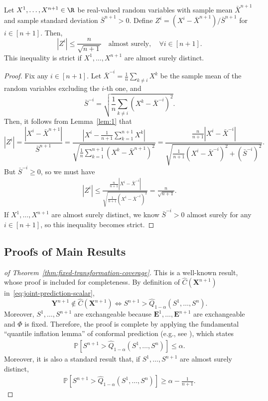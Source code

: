 \begin{lemma}\label{lem:3}
    Let $X^1,\ldots, X^{n+1} \in \R$ be real-valued random variables with sample mean $\bar{X}^{n+1}$ and sample standard deviation $\bar{S}^{n+1} > 0$. Define $Z^i = (X^i-\bar{X}^{n+1}) / \bar{S}^{n+1}$ for $i \in [n+1]$. Then,
    \[
    |Z^i| \leq \frac{n}{\sqrt{n+1}} \quad\text{almost surely}, \quad \forall i \in [n+1].
    \]
    This inequality is strict if $X^1,\ldots,X^{n+1}$ are almost surely distinct.
\end{lemma}
\begin{proof}
Fix any $i\in [n+1]$.
Let $\bar{X}^{-i} = \frac{1}{n}\sum_{k\neq i}X^k$ be the sample mean of the random variables excluding the $i$-th one, and
\[
\bar{S}^{-i} = \sqrt{\frac{1}{n}\sum_{k\neq i}(X^k - \bar{X}^{-i})^2}.
\]
Then, it follows from Lemma~\ref{lem:1} that
\[
|Z^i| = \frac{|X^i-\bar{X}^{n+1}|}{\bar{S}^{n+1}}
    = \frac{\left|X^i - \frac{1}{n+1}\sum^{n+1}_{k=1}X^k\right|}{\sqrt{\frac{1}{n}\sum^{n+1}_{k=1}(X^k - \bar{X}^{n+1})^2}}=\frac{\frac{n}{n+1}|X^i - \bar{X}^{-i}|}{\sqrt{\frac{1}{n+1}(X^i-\bar{X}^{-i})^2+(\bar{S}^{-i})^2}}.
\]
But $\bar{S}^{-i} \geq 0$, so we must have
\begin{align*}
    |Z^i|\leq \frac{\frac{n}{n+1}|X^i - \bar{X}^{-i}|}{\sqrt{\frac{1}{n+1}(X^i-\bar{X}^{-i})^2}}= \frac{n}{\sqrt{n+1}}.
\end{align*}
If $X^1,\ldots,X^{n+1}$ are almost surely distinct, we know $\bar{S}^{-i} >0$ almost surely for any $i \in [n+1]$, so this inequality becomes strict.
\end{proof}


\subsection{Proofs of Main Results}
\label{app:proofs-thms}

\begin{proof}[of Theorem~\ref{thm:fixed-transformation-coverage}]
This is a well-known result, whose proof is included for completeness. 
By definition of $\hat{C}(\mathbf{X}^{n+1})$ in~\eqref{eq:joint-prediction-scalar},
\[
 \mathbf{Y}^{n+1} \notin \hat{C}(\mathbf{X}^{n+1}) \Longleftrightarrow S^{n+1} > \hat{Q}_{1-\alpha}(S^1,\ldots,S^n).
\]
Moreover, $S^1,\ldots,S^{n+1}$ are exchangeable because $\mathbf{E}^1,\ldots,\mathbf{E}^{n+1}$ are exchangeable and $\Phi$ is fixed.
Therefore, the proof is complete by applying the fundamental ``quantile inflation lemma'' of conformal prediction (e.g., see \citet{angelopoulos2025theoreticalfoundationsconformalprediction}), which states 
\begin{align*}
  \mathbb{P}\left[ S^{n+1} > \hat{Q}_{1-\alpha}(S^1,\ldots,S^n) \right] \leq \alpha.
\end{align*}
Moreover, it is also a standard result that, if $S^1,\ldots,S^{n+1}$ are almost surely distinct,
\begin{align*}
  \mathbb{P}\left[ S^{n+1} > \hat{Q}_{1-\alpha}(S^1,\ldots,S^n) \right] \geq \alpha - \frac{1}{n+1}.
\end{align*}
\end{proof}

